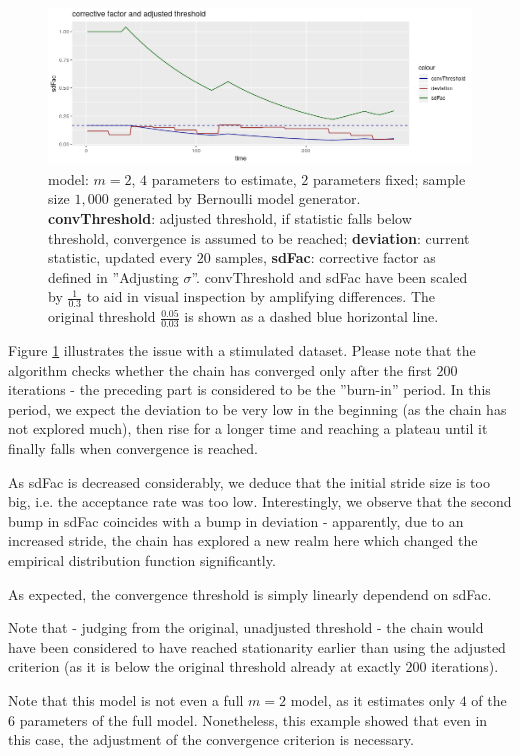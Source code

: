 \begin{figure}
	\includegraphics[width=\linewidth]{img/adjusted_threshold_explained.png}
	\caption{model: $m=2$, $4$ parameters to estimate, $2$ parameters fixed; sample size $1,000$ generated by Bernoulli model generator. \\ \textbf{convThreshold}: adjusted threshold, if statistic falls below threshold, convergence is assumed to be reached; \textbf{deviation}: current statistic, updated every $20$ samples, \textbf{sdFac}: corrective factor as defined in ''Adjusting $\sigma$''. convThreshold and sdFac have been scaled by $\frac{1}{0.3}$ to aid in visual inspection by amplifying differences.  The original threshold $\frac{0.05}{0.03}$ is shown as a dashed blue horizontal line.
	}
	\label{fig:adjusted_threshold_works}
\end{figure}

Figure \ref{fig:adjusted_threshold_works} illustrates the issue with a stimulated dataset. Please note that the algorithm checks whether the chain has converged only after the first $200$ iterations - the preceding part is considered to be the ''burn-in'' period. In this period, we expect the deviation to be very low in the beginning (as the chain has not explored much), then rise for a longer time and reaching a plateau until it finally falls when convergence is reached. 

As sdFac is decreased considerably, we deduce that the initial stride size is too big, i.e. the acceptance rate was too low. Interestingly, we observe that the second bump in sdFac coincides with a bump in deviation - apparently, due to an increased stride, the chain has explored a new realm here which changed the empirical distribution function significantly. 

As expected, the convergence threshold is simply linearly dependend on sdFac. 

Note that - judging from the original, unadjusted threshold - the chain would have been considered to have reached stationarity earlier than using the adjusted criterion (as it is below the original threshold already at exactly $200$ iterations).

Note that this model is not even a full $m=2$ model, as it estimates only $4$ of the $6$ parameters of the full model. Nonetheless, this example showed that even in this case, the adjustment of the convergence criterion is necessary. 

